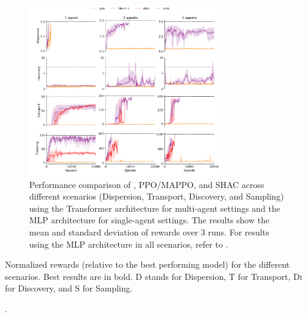 \begin{figure}[t]
    \centering
    \includegraphics[width=0.75\textwidth]{figs/main-transformer.pdf}
    \caption{Performance comparison of \fname{}, PPO/MAPPO, and SHAC across different scenarios (Dispersion, Transport, Discovery, and Sampling) using the Transformer architecture for multi-agent settings and the MLP architecture for single-agent settings. The results show the mean and standard deviation of rewards over 3 runs. For results using the MLP architecture in all scenarios, refer to .}%
    \label{fig:experiments}
\end{figure}

\begin{table}[t]
    \centering
    
    \vspace{0.2cm}
    \caption{Normalized rewards (relative to the best performing model) for the different scenarios. Best results are in bold. \textsc{D} stands for Dispersion, \textsc{T} for Transport, \textsc{Di} for Discovery, and \textsc{S} for Sampling.}\label{tab:max-rewards}.
\end{table}


